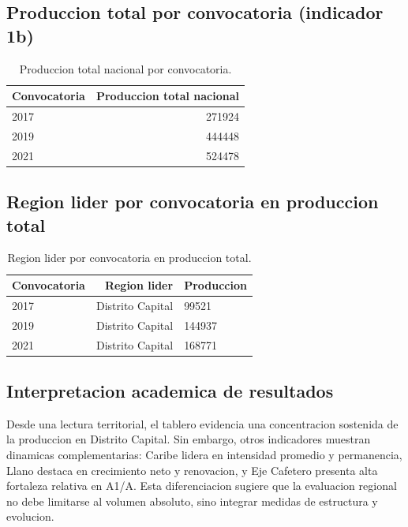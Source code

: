 \documentclass[12pt,letterpaper]{article}
\begin{document}
\subsection{Produccion total por convocatoria (indicador 1b)}

\begin{table}[H]
\centering
\begin{tabular}{lr}
\toprule
\textbf{Convocatoria} & \textbf{Produccion total nacional} \\
\midrule
2017 & 271924 \\
2019 & 444448 \\
2021 & 524478 \\
\bottomrule
\end{tabular}
\caption{Produccion total nacional por convocatoria.}
\end{table}

\subsection{Region lider por convocatoria en produccion total}

\begin{table}[H]
\centering
\begin{tabular}{lrl}
\toprule
\textbf{Convocatoria} & \textbf{Region lider} & \textbf{Produccion} \\
\midrule
2017 & Distrito Capital & 99521 \\
2019 & Distrito Capital & 144937 \\
2021 & Distrito Capital & 168771 \\
\bottomrule
\end{tabular}
\caption{Region lider por convocatoria en produccion total.}
\end{table}

\subsection{Interpretacion academica de resultados}

Desde una lectura territorial, el tablero evidencia una concentracion sostenida de la produccion en Distrito Capital. Sin embargo, otros indicadores muestran dinamicas complementarias: Caribe lidera en intensidad promedio y permanencia, Llano destaca en crecimiento neto y renovacion, y Eje Cafetero presenta alta fortaleza relativa en A1/A. Esta diferenciacion sugiere que la evaluacion regional no debe limitarse al volumen absoluto, sino integrar medidas de estructura y evolucion.
\end{document}
